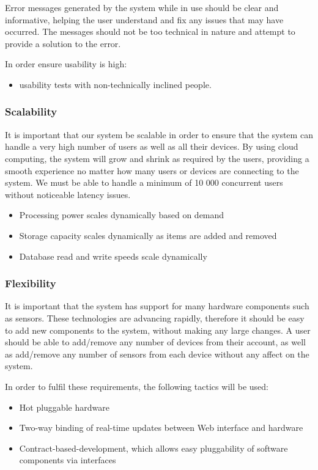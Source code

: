 \documentclass{article}
\begin{document}
			Error messages generated by the system while in use should be clear and informative, helping the user understand and fix any issues that may have occurred. The messages should not be too technical in nature and attempt to provide a solution to the error.
			
			In order ensure usability is high:
			\begin{itemize}
				\item usability tests with non-technically inclined people.
			\end{itemize} 
			
		\subsubsection{Scalability}
			It is important that our system be scalable in order to ensure that the system can handle a very high number of users as well as all their devices. By using cloud computing, the system will grow and shrink as required by the users, providing a smooth experience no matter how many users or devices are connecting to the system. We must be able to handle a minimum of 10 000 concurrent users without noticeable latency issues.
			
			\begin{itemize}
				\item Processing power scales dynamically based on demand
				\item Storage capacity scales dynamically as items are added and removed
				\item Database read and write speeds scale dynamically
			\end{itemize}
			
		\subsubsection{Flexibility}
			It is important that the system has support for many hardware components such as sensors. These technologies are advancing rapidly, therefore it should be easy to add new components to the system, without making any large changes. A user should be able to add/remove any number of devices from their account, as well as add/remove any number of sensors from each device without any affect on the system.
			
			In order to fulfil these requirements, the following tactics will be used:
			\begin{itemize}
				\item Hot pluggable hardware
				\item Two-way binding of real-time updates between Web interface and hardware 
				\item Contract-based-development, which allows easy pluggability of software components via interfaces
			\end{itemize}
			
\end{document}
